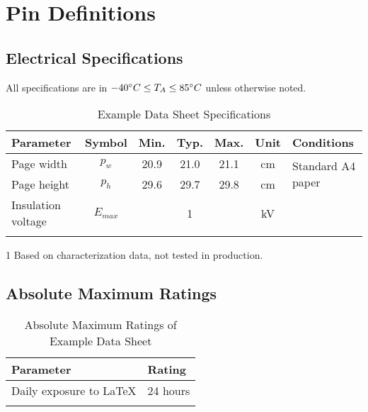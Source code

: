 \documentclass[10pt]{datasheet}
\begin{document}
\section{Pin Definitions}

\subsection{Electrical Specifications}
	All specifications are in $-40\degree C \leq T_A \leq 85\degree C$ unless otherwise noted.
	
	\begin{table}[h]
		\begin{threeparttable}
			\caption{Example Data Sheet Specifications}
			\begin{tabularx}{\textwidth}{l | c | c c c | c | X}
				\thickhline
				\textbf{Parameter} & \textbf{Symbol} & \textbf{Min.} & \textbf{Typ.} & \textbf{Max.} &
				\textbf{Unit} & \textbf{Conditions} \\
				\hline
				Page width  & $p_w$ & 20.9 & 21.0 & 21.1 & cm & \multirow{2}{*}{Standard A4 paper} \\
				Page height & $p_h$ & 29.6 & 29.7 & 29.8 & cm &  \\
				\hline
				Insulation voltage & $E_{max}$\tnote{1} & & 1 & & kV & \\
				\thickhline
			\end{tabularx}
			
			\begin{tablenotes}
				\item[1]{Based on characterization data, not tested in production.}
			\end{tablenotes}
		\end{threeparttable}
	\end{table}

\subsection{Absolute Maximum Ratings}

	\begin{table}[h]
		\caption{Absolute Maximum Ratings of Example Data Sheet}
		\begin{tabularx}{\textwidth}{l | X}
			\thickhline
			\textbf{Parameter} & \textbf{Rating} \hspace{5cm} \\
			\hline
			Daily exposure to LaTeX & 24 hours \\
			\thickhline
		\end{tabularx}
	\end{table}
	
\end{document}
